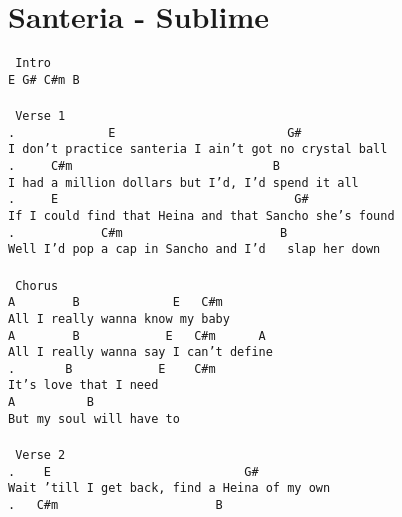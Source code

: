 \newpage
\section{Santeria - Sublime}
\label{Santeria - Sublime}
\texttt{\lbrack\ Intro\rbrack\\
E\ G\#\ C\#m\ B\\
\\
\lbrack\ Verse\ 1\rbrack\\
.\ \ \ \ \ \ \ \ \ \ \ \ \ E\ \ \ \ \ \ \ \ \ \ \ \ \ \ \ \ \ \ \ \ \ \ \ \ G\#\ \ \ \ \ \ \ \ \ \ \ \ \ \ \ \ \\
I\ don't\ practice\ santeria\ I\ ain't\ got\ no\ crystal\ ball\\
.\ \ \ \ \ C\#m\ \ \ \ \ \ \ \ \ \ \ \ \ \ \ \ \ \ \ \ \ \ \ \ \ \ \ \ B\\
I\ had\ a\ million\ dollars\ but\ I'd,\ I'd\ spend\ it\ all\\
.\ \ \ \ \ E\ \ \ \ \ \ \ \ \ \ \ \ \ \ \ \ \ \ \ \ \ \ \ \ \ \ \ \ \ \ \ \ \ G\#\\
If\ I\ could\ find\ that\ Heina\ and\ that\ Sancho\ she's\ found\\
.\ \ \ \ \ \ \ \ \ \ \ \ C\#m\ \ \ \ \ \ \ \ \ \ \ \ \ \ \ \ \ \ \ \ \ \ B\ \\
Well\ I'd\ pop\ a\ cap\ in\ Sancho\ and\ I'd\ \ \ slap\ her\ down\\
\\
\lbrack\ Chorus\rbrack\\
A\ \ \ \ \ \ \ \ B\ \ \ \ \ \ \ \ \ \ \ \ \ E\ \ \ C\#m\\
All\ I\ really\ wanna\ know\ my\ baby\\
A\ \ \ \ \ \ \ \ B\ \ \ \ \ \ \ \ \ \ \ \ E\ \ \ C\#m\ \ \ \ \ \ A\\
All\ I\ really\ wanna\ say\ I\ can't\ define\\
.\ \ \ \ \ \ \ B\ \ \ \ \ \ \ \ \ \ \ \ E\ \ \ \ C\#m\\
It's\ love\ that\ I\ need\ \\
A\ \ \ \ \ \ \ \ \ \ B\\
But\ my\ soul\ will\ have\ to\\
\\
\lbrack\ Verse\ 2\rbrack\\
.\ \ \ \ E\ \ \ \ \ \ \ \ \ \ \ \ \ \ \ \ \ \ \ \ \ \ \ \ \ \ \ G\#\\
Wait\ 'till\ I\ get\ back,\ find\ a\ Heina\ of\ my\ own\\
.\ \ \ C\#m\ \ \ \ \ \ \ \ \ \ \ \ \ \ \ \ \ \ \ \ \ \ B\\
}
